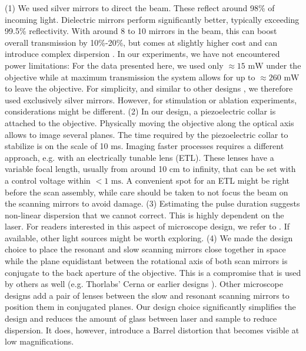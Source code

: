 \documentclass[10pt,letterpaper]{article}
\begin{document}
(1) We used silver mirrors to direct the beam. These reflect around 98\% of incoming light. Dielectric mirrors perform significantly better, typically exceeding 99.5\% reflectivity. With around 8 to 10 mirrors in the beam, this can boost overall transmission by 10\%-20\%, but comes at slightly higher cost and can introduce complex dispersion \cite{Rupprecht2019}. In our experiments, we have not encountered power limitations: For the data presented here, we used only $\approx 15\text{ mW}$ under the objective while at maximum transmission the system allows for up to $\approx 260\text{ mW}$ to leave the objective. For simplicity, and similar to other designs \cite{Sofroniew2016}, we therefore used exclusively silver mirrors. However, for stimulation or ablation experiments, considerations might be different. \newline
(2) In our design, a piezoelectric collar is attached to the objective. Physically moving the objective along the optical axis allows to image several planes. The time required by the piezoelectric collar to stabilize is on the scale of 10 ms. Imaging faster processes requires a different approach, e.g. with an electrically tunable lens (ETL). These lenses have a variable focal length, usually from around 10 cm to infinity, that can be set with a control voltage within $<1\text{ ms}$. A convenient spot for an ETL might be right before the scan assembly, while care should be taken to not focus the beam on the scanning mirrors to avoid damage.\newline
(3) Estimating the pulse duration suggests non-linear dispersion that we cannot correct. This is highly dependent on the laser. For readers interested in this aspect of microscope design, we refer to \cite{Saidi2023, Bueno2019}. If available, other light sources might be worth exploring.\newline
(4) We made the design choice to place the resonant and slow scanning mirrors close together in space while the plane equidistant between the rotational axis of both scan mirrors is conjugate to the back aperture of the objective. This is a compromise that is used by others as well (e.g. Thorlabs' Cerna or earlier designs \cite{Rosenegger2014, Tan1999, Nguyen2001}). Other microscope designs add a pair of lenses between the slow and resonant scanning mirrors to position them in conjugated planes. Our design choice significantly simplifies the design and reduces the amount of glass between laser and sample to reduce dispersion. It does, however, introduce a Barrel distortion that becomes visible at low magnifications.\newline
\end{document}
